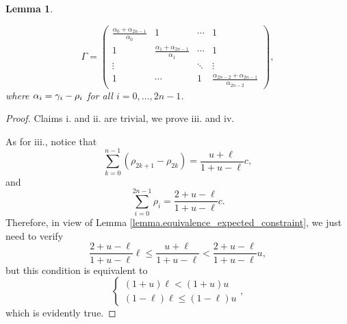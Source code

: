 \documentclass[10pt, article,table]{article}
\newtheorem{lemma}[thm]{Lemma}
\begin{document}
\begin{lemma}
\begin{enumerate}[label={\roman{*}.}, ref={\ref{lemma.proposal_dirparam}.\roman{*}}]
 \begin{equation*}
  \Gamma = 
  \begin{pmatrix}
   \frac{\alpha_{0} + \alpha_{2n-1}}{\alpha_0}
   &   1   &   \cdots   &   1
   \\
   1 &
   \frac{\alpha_{1} + \alpha_{2n-1}}{\alpha_1}
   & \cdots & 1 
   \\
   \vdots & & \ddots & \vdots\\
   1 &\cdots & 1 &
   \frac{\alpha_{2n-2} + \alpha_{2n-1}}{\alpha_{2n-2}}
  \end{pmatrix},
 \end{equation*}
 where $\alpha_i = \gamma_i  - \rho_i$ for all $i=0,\dots,2n-1$. 
\end{enumerate}
\end{lemma}
\begin{proof}
Claims i. and ii. are trivial, we prove iii. and iv. 
 
As for iii., notice that 
\begin{equation*}
 \sum_{k=0}^{n-1} (\rho_{2k+1} - \rho_{2k}) = \frac{u+\ell}{1+u-\ell}c,
\end{equation*}
and 
\begin{equation*}
 \sum_{i=0}^{2n-1} \rho_{i}  = \frac{2+u-\ell}{1+u-\ell}c.
\end{equation*}
Therefore, in view of Lemma \ref{lemma.equivalence_expected_constraint}, we just need to verify
\begin{equation*}
 \frac{2+u-\ell}{1+u-\ell}\ell
 \leq 
 \frac{u+\ell}{1+u-\ell}
 <
 \frac{2+u-\ell}{1+u-\ell} u ,
\end{equation*}
but this condition is equivalent to 
\begin{equation*}
 \begin{cases}
  (1+u)\ell < (1+u)u \\
  (1-\ell)\ell \leq (1-\ell) u
 \end{cases},
\end{equation*}
which is evidently true.


\end{proof}
\end{document}
